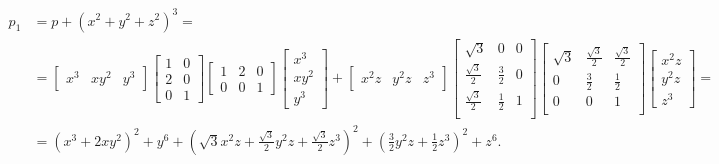 \documentclass[nonacm]{acmart}
\begin{document}
\begin{equation*}
    \begin{aligned}
        p_1 & = p+(x^2+y^2+z^2)^3 =                                                                            \\
            & =
        \begin{bmatrix}
            x^3 & xy^2 & y^3
        \end{bmatrix}
        \begin{bmatrix}
            1 & 0 \\
            2 & 0 \\
            0 & 1
        \end{bmatrix}
        \begin{bmatrix}
            1 & 2 & 0 \\
            0 & 0 & 1
        \end{bmatrix}
        \begin{bmatrix}
            x^3 \\ xy^2 \\ y^3
        \end{bmatrix}
        +
        \begin{bmatrix}
            x^2z & y^2z & z^3
        \end{bmatrix}
        \begin{bmatrix}
            \sqrt{3}           & 0       & 0 \\
            \frac{\sqrt{3}}{2} & \frac32 & 0 \\
            \frac{\sqrt{3}}{2} & \frac12 & 1 \\
        \end{bmatrix}
        \begin{bmatrix}
            \sqrt{3} & \frac{\sqrt{3}}{2} & \frac{\sqrt{3}}{2} \\
            0        & \frac32            & \frac12            \\
            0        & 0                  & 1                  \\
        \end{bmatrix}
        \begin{bmatrix}
            x^2z \\ y^2z \\ z^3
        \end{bmatrix}=                                                                                     \\
            & = (x^3+2xy^2)^2 + y^6 + \left(\sqrt{3}x^2z+\frac{\sqrt{3}}{2}y^2z+\frac{\sqrt{3}}{2}z^3\right)^2
        + \left(\frac32 y^2z+\frac12 z^3\right)^2+z^6.
    \end{aligned}
\end{equation*}
\end{document}
